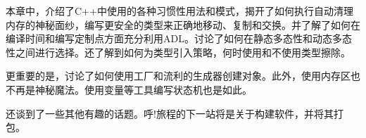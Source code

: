 本章中，介绍了C++中使用的各种习惯性用法和模式，揭开了如何执行自动清理内存的神秘面纱，编写更安全的类型来正确地移动、复制和交换。并了解了如何在编译时间和编写定制点方面充分利用ADL。讨论了如何在静态多态性和动态多态性之间进行选择。还了解到如何为类型引入策略，何时使用和不使用类型擦除。

更重要的是，讨论了如何使用工厂和流利的生成器创建对象。此外，使用内存区也不再是神秘魔法。使用变量等工具编写状态机也是如此。

还谈到了一些其他有趣的话题。呼!旅程的下一站将是关于构建软件，并将其打包。